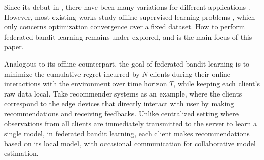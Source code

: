 Since its debut in \citeyear{mcmahan2017communication}, there have been many variations for different applications \citep{yang2019federated}. However, most existing works study offline supervised learning problems \citep{li2019convergence,zhao2018federated}, which only concerns optimization convergence over a fixed dataset. How to perform federated bandit learning remains under-explored, and is the main focus of this paper. 

Analogous to its offline counterpart, the goal of federated bandit learning is to minimize the cumulative regret incurred by $N$ clients during their online interactions with the environment over time horizon $T$,
while keeping each client's raw data local. Take recommender systems as an example, where the clients correspond to the edge devices that directly interact with user by making recommendations and receiving feedbacks. Unlike centralized setting where observations from all clients are immediately transmitted to the server to learn a single model, in federated bandit learning, each client makes recommendations based on its local model, with occasional communication for collaborative model estimation.




